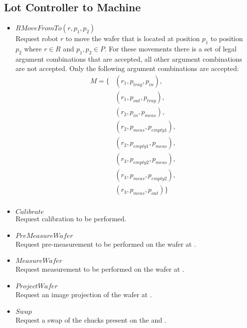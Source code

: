 \subsection{Lot Controller to Machine}
\begin{itemize}
    \item $\mathit{RMoveFromTo}(r, p_1, p_2)$ \\
        Request robot $r$ to move the wafer that is located at position $p_1$ to position $p_2$ where $r \in R$ and $p_1, p_2 \in P$.
        For these movements there is a set of legal argument combinations that are accepted, all other argument combinations are not accepted.
        Only the following argument combinations are accepted:
        \begin{align*}
            M = \{ & \left(r_1, p_\mathit{tray},   p_\mathit{in}     \right), \\
                   & \left(r_1, p_\mathit{out},    p_\mathit{tray}   \right), \\
                   & \left(r_2, p_\mathit{in},     p_\mathit{meas}   \right), \\
                   & \left(r_2, p_\mathit{meas},   p_\mathit{empty1} \right), \\
                   & \left(r_2, p_\mathit{empty1}, p_\mathit{meas}   \right), \\
                   & \left(r_3, p_\mathit{empty2}, p_\mathit{meas}   \right), \\
                   & \left(r_3, p_\mathit{meas},   p_\mathit{empty2} \right), \\
                   & \left(r_3, p_\mathit{meas},   p_\mathit{out}    \right)\} \\
        \end{align*}

    \item $\mathit{Calibrate}$ \\
    Request calibration to be performed.
   
    \item $\mathit{PreMeasureWafer}$ \\
    Request pre-measurement to be performed on the wafer at \chuckIn.
   
    \item $\mathit{MeasureWafer}$ \\
    Request measurement to be performed on the wafer at \chuckMeas.
 
    \item $\mathit{ProjectWafer}$ \\
    Request an image projection of the wafer at \chuckProj.
 
    \item $\mathit{Swap}$ \\
    Request a swap of the chucks present on the \chuckMeas and \chuckProj.
\end{itemize}

